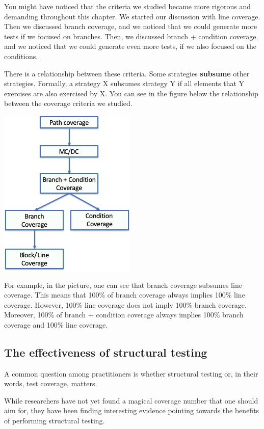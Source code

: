 You might have noticed that the criteria we studied became more rigorous
and demanding throughout this chapter. We started our discussion with
line coverage. Then we discussed branch coverage, and we noticed that we
could generate more tests if we focused on branches. Then, we discussed
branch + condition coverage, and we noticed that we could generate even
more tests, if we also focused on the conditions.

There is a relationship between these criteria. Some strategies
\textbf{subsume} other strategies. Formally, a strategy X subsumes
strategy Y if all elements that Y exercises are also exercised by X. You
can see in the figure below the relationship between the coverage
criteria we studied.

\includegraphics{img/structural-testing/subsumption.png}

For example, in the picture, one can see that branch coverage subsumes
line coverage. This means that 100\% of branch coverage always implies
100\% line coverage. However, 100\% line coverage does not imply 100\%
branch coverage. Moreover, 100\% of branch + condition coverage always
implies 100\% branch coverage and 100\% line coverage.

\hypertarget{the-effectiveness-of-structural-testing}{%
\subsection{The effectiveness of structural
testing}\label{the-effectiveness-of-structural-testing}}

A common question among practitioners is whether structural testing or,
in their words, test coverage, matters.

While researchers have not yet found a magical coverage number that one
should aim for, they have been finding interesting evidence pointing
towards the benefits of performing structural testing.

